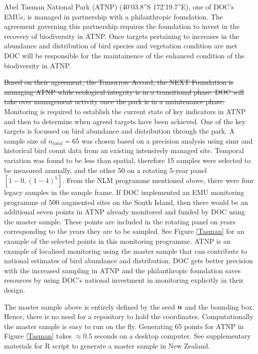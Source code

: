 \documentclass[titlepage]{article}
\begin{document}
Abel Tasman National Park (ATNP) (40'03.8''S 172'19.7''E), one of DOC's EMUs, is managed in partnership with a philanthropic foundation. The agreement governing this partnership requires the foundation to invest in the recovery of biodiversity in ATNP. Once targets pertaining to increases in the abundance and distribution of bird species and vegetation condition are met DOC will be responsible for the maintainence of the enhanced condition of the biodiversity in ATNP. 

\st{Based on their agreement, the Tomorrow Accord, the NEXT Foundation is managing ATNP while ecological integrity is in a transitional phase. DOC will take over management activity once the park is in a maintenance phase.} Monitoring is required to establish the current state of key indicators in ATNP and then to determine when agreed targets have been achieved. One of the key targets is focussed on bird abundance and distribution through the park. A sample size of $n_{total} = 65$ was chosen based on a precision analysis using simr \citep{simr} and historical bird count data from an existing intensively managed site. Temporal variation was found to be less than spatial, therefore 15 samples were selected to be measured annually, and the other 50 on a rotating 5-year panel $[1-0,(1-4)^5]$. From the NLM programme mentioned above, there were four legacy samples in the sample frame. If DOC implemented an EMU monitoring programme of 500 augmented sites on the South Island, then there would be an additional seven points in ATNP already monitored and funded by DOC using the master sample. These points are included in the rotating panel on years corresponding to the years they are to be sampled. See Figure \ref{Tasman} for an example of the selected points in this monitoring programme. ATNP is an example of localised monitoring using the master sample that can contribute to national estimates of bird abundance and distribution. DOC gets better precision with the increased sampling in ATNP and the philanthropic foundation saves resources by using DOC's national investment in monitoring explicitly in their design.

The master sample above is entirely defined by the seed ${\bf u}$ and the bounding box. Hence, there is no need for a repository to hold the coordinates. Computationally the master sample is easy to run on the fly. Generating 65 points for ATNP in Figure \ref{Tasman} takes $\approx 0.5$ seconds on a desktop computer. See supplementary materials for R script to generate a master sample in New Zealand.
\end{document}
